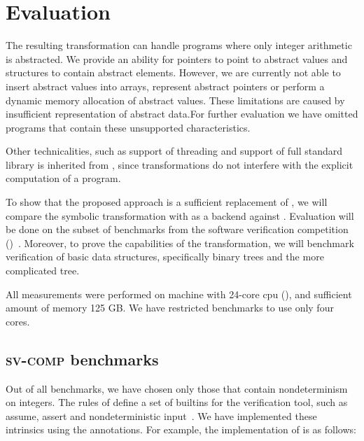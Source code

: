 \chapter{Evaluation}\label{ch:results}

The resulting transformation can handle programs where only integer
arithmetic is abstracted. We provide an ability for pointers to point to
abstract values and structures to contain abstract elements. However, we are
currently not able to insert abstract values into arrays, represent abstract
pointers or perform a dynamic memory allocation of abstract values. These
limitations are caused by insufficient representation of abstract
data.For further evaluation we have omitted programs that contain
these unsupported characteristics.

Other technicalities, such as support of threading and support of full \Cpp{}
standard library is inherited from \DIVINE, since transformations do not
interfere with the explicit computation of a program.

To show that the proposed approach is a sufficient replacement of \SymDIVINE, we
will compare the symbolic transformation with \DIVINE as a backend against
\SymDIVINE. Evaluation will be done on the subset of benchmarks from the software
verification competition (\svcomp)~\cite{Beyer17}.
Moreover, to prove the capabilities of the transformation, we will benchmark
verification of basic data structures, specifically binary trees and the more
complicated \AVL tree.

All measurements were performed on machine with 24-core cpu (), and sufficient amount of memory 125 GB. We have restricted benchmarks to use
only four cores.

\section{\textsc{sv-comp} benchmarks}

Out of all \svcomp benchmarks, we have chosen only those that contain
nondeterminism on integers. The rules of \svcomp define a set of builtins for the
verification tool, such as assume, assert and nondeterministic
input~\cite{svcomp}. We have implemen\-ted these intrinsics using the annotations.
For example, the implementation of  is as
follows:

